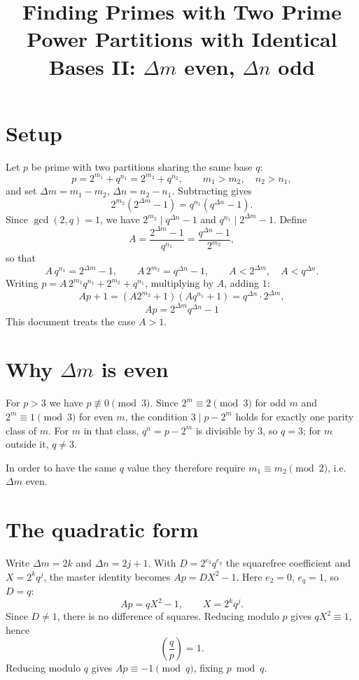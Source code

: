 \documentclass[11pt]{article}
\title{Finding Primes with Two Prime Power Partitions with Identical Bases II: $\Delta m$ even, $\Delta n$ odd}
\date{}
\begin{document}
\maketitle

\section*{Setup}

Let $p$ be prime with two partitions sharing the same base $q$:
\[
p = 2^{m_1} + q^{n_1} = 2^{m_2} + q^{n_2}, \qquad m_1 > m_2, \quad n_2 > n_1,
\]
and set $\Delta m = m_1 - m_2$, $\Delta n = n_2 - n_1$. Subtracting gives
\[
2^{m_2}\left(2^{\Delta m} - 1\right) = q^{n_1}\left(q^{\Delta n} - 1\right).
\]
Since $\gcd(2,q) = 1$, we have $2^{m_2} \mid q^{\Delta n} - 1$ and $q^{n_1} \mid 2^{\Delta m} - 1$. Define
\[
A = \frac{2^{\Delta m} - 1}{q^{n_1}} = \frac{q^{\Delta n} - 1}{2^{m_2}},
\]
so that
\[
A\,q^{n_1} = 2^{\Delta m} - 1, \qquad A\,2^{m_2} = q^{\Delta n} - 1, \qquad A < 2^{\Delta m}, \quad A < q^{\Delta n}.
\]
Writing $p = A\,2^{m_2}q^{n_1} + 2^{m_2} + q^{n_1}$, multiplying by $A$, adding $1$:
\[
Ap + 1 = \left(A2^{m_2} + 1\right)\left(Aq^{n_1} + 1\right) = q^{\Delta n} \cdot 2^{\Delta m},
\]
\[
\boxed{\,Ap = 2^{\Delta m} q^{\Delta n} - 1\,}
\]
This document treats the case $A > 1$.

\section*{Why $\Delta m$ is even}

For $p > 3$ we have $p \not\equiv 0 \pmod 3$. Since $2^m \equiv 2 \pmod 3$ for odd $m$ and $2^m \equiv 1 \pmod 3$ for even $m$, the condition $3 \mid p - 2^m$ holds for exactly one parity class of $m$. For $m$ in that class, $q^n = p - 2^m$ is divisible by $3$, so $q = 3$; for $m$ outside it, $q \neq 3$.

In order to have the same $q$ value they therefore require $m_1 \equiv m_2 \pmod 2$, i.e. $\Delta m$ even.

\section*{The quadratic form}

Write $\Delta m = 2k$ and $\Delta n = 2j + 1$. With $D = 2^{e_2}q^{e_q}$ the squarefree coefficient and $X = 2^k q^j$, the master identity becomes $Ap = DX^2 - 1$. Here $e_2 = 0$, $e_q = 1$, so $D = q$:
\[
Ap = qX^2 - 1, \qquad X = 2^k q^j.
\]
Since $D \neq 1$, there is no difference of squares. Reducing modulo $p$ gives $qX^2 \equiv 1$, hence
\[
\left(\frac{q}{p}\right) = 1.
\]
Reducing modulo $q$ gives $Ap \equiv -1 \pmod q$, fixing $p \bmod q$.
\end{document}

